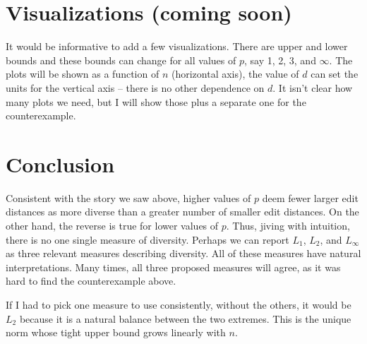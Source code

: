 \documentclass{article}
\begin{document}
\section{Visualizations (coming soon)}

It would be informative to add a few visualizations.  There are upper
and lower bounds and these bounds can change for all values of $p$,
say 1, 2, 3, and $\infty$.  The plots will be shown as a function of
$n$ (horizontal axis), the value of $d$ can set the units for the
vertical axis -- there is no other dependence on $d$.  It isn't clear
how many plots we need, but I will show those plus a separate one for
the counterexample.

\section{Conclusion}

Consistent with the story we saw above, higher values of $p$ deem
fewer larger edit distances as more diverse than a greater number of
smaller edit distances.  On the other hand, the reverse is true for
lower values of $p$.  Thus, jiving with intuition, there is no one
single measure of diversity.  Perhaps we can report $L_1$, $L_2$, and
$L_\infty$ as three relevant measures describing diversity.  All of
these measures have natural interpretations.  Many times, all three
proposed measures will agree, as it was hard to find the
counterexample above.

If I had to pick one measure to use consistently, without the others,
it would be $L_2$ because it is a natural balance between the two
extremes.  This is the unique norm whose tight upper bound grows
linearly with $n$.
\end{document}
